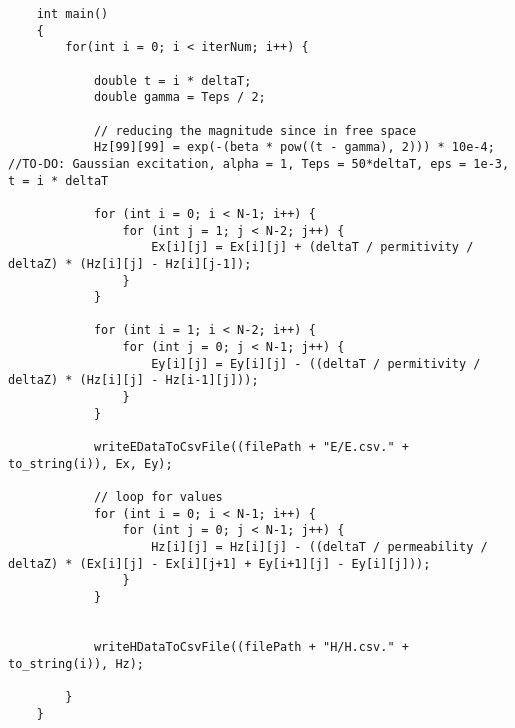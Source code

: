 \begin{verbatim}
	int main()
	{
		for(int i = 0; i < iterNum; i++) {
			
			double t = i * deltaT;
			double gamma = Teps / 2;
			
			// reducing the magnitude since in free space
			Hz[99][99] = exp(-(beta * pow((t - gamma), 2))) * 10e-4;  //TO-DO: Gaussian excitation, alpha = 1, Teps = 50*deltaT, eps = 1e-3, t = i * deltaT
			
			for (int i = 0; i < N-1; i++) {
				for (int j = 1; j < N-2; j++) {
					Ex[i][j] = Ex[i][j] + (deltaT / permitivity / deltaZ) * (Hz[i][j] - Hz[i][j-1]);
				}
			}
			
			for (int i = 1; i < N-2; i++) {
				for (int j = 0; j < N-1; j++) {
					Ey[i][j] = Ey[i][j] - ((deltaT / permitivity / deltaZ) * (Hz[i][j] - Hz[i-1][j]));
				}
			}
			
			writeEDataToCsvFile((filePath + "E/E.csv." + to_string(i)), Ex, Ey);
			
			// loop for values
			for (int i = 0; i < N-1; i++) {
				for (int j = 0; j < N-1; j++) {
					Hz[i][j] = Hz[i][j] - ((deltaT / permeability / deltaZ) * (Ex[i][j] - Ex[i][j+1] + Ey[i+1][j] - Ey[i][j]));
				}
			}
			
			
			writeHDataToCsvFile((filePath + "H/H.csv." + to_string(i)), Hz);
			
		}
	}
\end{verbatim}


